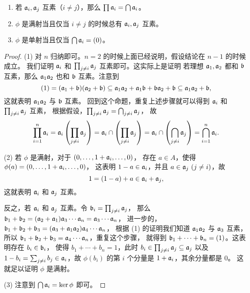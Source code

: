 \begin{proposition}
  \mbox{}
  \begin{enumerate}
    \item 若 $\mathfrak{a}_i,\mathfrak{a}_j$ 互素（$i\neq j$），那么 $\prod\mathfrak{a}_i=\bigcap \mathfrak{a}_i$。
    \item $\phi$ 是满射当且仅当 $i\neq j$ 的时候总有 $\mathfrak{a}_i,\mathfrak{a}_j$ 互素。
    \item $\phi$ 是单射当且仅当 $\bigcap\mathfrak{a}_i=(0)$。
  \end{enumerate}
\end{proposition}
\begin{proof}
  (1) 对 $n$ 归纳即可。$n=2$ 的时候上面已经说明，假设结论在 $n-1$ 的时候成立。
  我们证明 $\mathfrak{a}_i$ 和 $\prod_{j\neq i}\mathfrak{a}_j$ 互素即可。这实际上是证明
  若理想 $\mathfrak{a}_1,\mathfrak{a}_2$ 都和 $\mathfrak{b}$ 互素，那么 $\mathfrak{a}_1\mathfrak{a}_2$
  也和 $\mathfrak{b}$ 互素。注意到
  \[
    (1)=(\mathfrak{a}_1+\mathfrak{b})(\mathfrak{a}_2+\mathfrak{b})
    \subseteq \mathfrak{a}_1\mathfrak{a}_2+\mathfrak{a}_1\mathfrak{b}
    +\mathfrak{b}\mathfrak{a}_2+\mathfrak{b}  \subseteq
    \mathfrak{a}_1\mathfrak{a}_2+\mathfrak{b},
  \]
  这就表明 $\mathfrak{a}_1\mathfrak{a}_2$ 与 $\mathfrak{b}$ 互素。
  回到这个命题，重复上述步骤就可以得到 $\mathfrak{a}_i$ 和 $\prod_{j\neq i}\mathfrak{a}_j$ 互素，
  根据假设，$\prod_{j\neq i}\mathfrak{a}_j=\bigcap_{j\neq i}\mathfrak{a}_j$，
  故
  \[
    \prod_{i=1}^n \mathfrak{a}_i
    =\mathfrak{a}_i\left(\prod_{j\neq i} \mathfrak{a}_j\right)  
    =\mathfrak{a}_i\cap\left(\prod_{j\neq i} \mathfrak{a}_j\right)  
    =\mathfrak{a}_i\cap\left(\bigcap_{j\neq i}\mathfrak{a}_j\right)
    =\bigcap_{i=1}^n\mathfrak{a}_i.
  \]

  (2) 若 $\phi$ 是满射，对于 $(0,\dots,1+\mathfrak{a}_i,\dots,0)$，
  存在 $a\in A$，使得 $\phi(a)=(0,\dots,1+\mathfrak{a}_i,\dots,0)$，
  这表明 $1-a\in\mathfrak{a}_i$，并且 $a\in\mathfrak{a}_j\ (j\neq i)$，故
  \[
    1=  (1-a)+a\in \mathfrak{a}_i+\mathfrak{a}_j,
  \]
  这就表明 $\mathfrak{a}_i$ 和 $\mathfrak{a}_j$ 互素。

  反之，若 $\mathfrak{a}_i$ 和 $\mathfrak{a}_j$ 互素。令 $\mathfrak{b}_i=\prod_{j\neq i}\mathfrak{a}_j$，
  那么 $\mathfrak{b}_1+\mathfrak{b}_2=(\mathfrak{a}_2+\mathfrak{a}_1)\mathfrak{a}_3\cdots\mathfrak{a}_n=\mathfrak{a}_3\cdots\mathfrak{a}_n$，
  进一步的，$\mathfrak{b}_1+\mathfrak{b}_2+\mathfrak{b}_3=(\mathfrak{a}_3+\mathfrak{a}_1\mathfrak{a}_2)\mathfrak{a}_4\cdots\mathfrak{a}_n$，
  根据 (1) 的证明我们知道 $\mathfrak{a}_1\mathfrak{a}_2$ 与 $\mathfrak{a}_3$ 互素，所以
  $\mathfrak{b}_1+\mathfrak{b}_2+\mathfrak{b}_3=\mathfrak{a}_4\cdots\mathfrak{a}_n$，重复这个步骤，
  就得到 $\mathfrak{b}_1+\cdots+\mathfrak{b}_n=(1)$。这表明存在 $b_i\in\mathfrak{b}_i$，
  使得 $b_1+\cdots +b_n=1$，此时 $b_i\in \prod_{j\neq i}\mathfrak{a}_j\subseteq \mathfrak{a}_j$
  以及 $1-b_i=\sum_{j\neq i}b_j\in\mathfrak{a}_i$，故
  $\phi(b_i)$ 的第 $i$ 个分量是 $1+\mathfrak{a}_i$，其余分量都是 $0$。
  这就足以证明 $\phi$ 是满射。

  (3) 注意到 $\bigcap \mathfrak{a}_i= \ker\phi$ 即可。
\end{proof}

